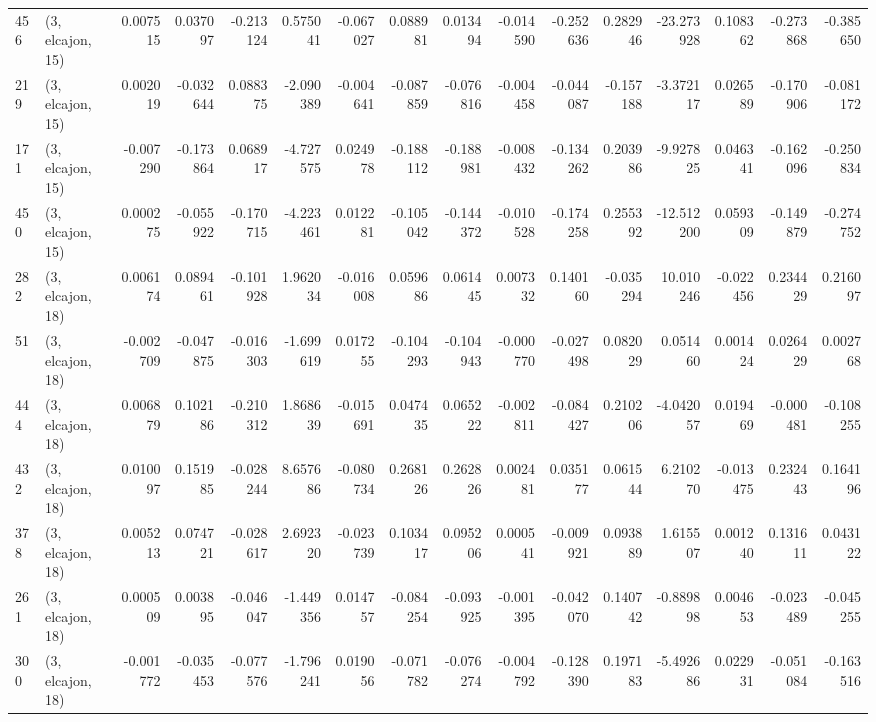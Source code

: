 \begin{tabular}{llrrrrrrrrrrrrrr}
456 &  (3, elcajon, 15) &   0.007515 &  0.037097 & -0.213124 &    0.575041 & -0.067027 &   0.088981 &  0.013494 & -0.014590 & -0.252636 &  0.282946 &   -23.273928 &  0.108362 & -0.273868 & -0.385650 \\
219 &  (3, elcajon, 15) &   0.002019 & -0.032644 &  0.088375 &   -2.090389 & -0.004641 &  -0.087859 & -0.076816 & -0.004458 & -0.044087 & -0.157188 &    -3.372117 &  0.026589 & -0.170906 & -0.081172 \\
171 &  (3, elcajon, 15) &  -0.007290 & -0.173864 &  0.068917 &   -4.727575 &  0.024978 &  -0.188112 & -0.188981 & -0.008432 & -0.134262 &  0.203986 &    -9.927825 &  0.046341 & -0.162096 & -0.250834 \\
450 &  (3, elcajon, 15) &   0.000275 & -0.055922 & -0.170715 &   -4.223461 &  0.012281 &  -0.105042 & -0.144372 & -0.010528 & -0.174258 &  0.255392 &   -12.512200 &  0.059309 & -0.149879 & -0.274752 \\
282 &  (3, elcajon, 18) &   0.006174 &  0.089461 & -0.101928 &    1.962034 & -0.016008 &   0.059686 &  0.061445 &  0.007332 &  0.140160 & -0.035294 &    10.010246 & -0.022456 &  0.234429 &  0.216097 \\
51  &  (3, elcajon, 18) &  -0.002709 & -0.047875 & -0.016303 &   -1.699619 &  0.017255 &  -0.104293 & -0.104943 & -0.000770 & -0.027498 &  0.082029 &     0.051460 &  0.001424 &  0.026429 &  0.002768 \\
444 &  (3, elcajon, 18) &   0.006879 &  0.102186 & -0.210312 &    1.868639 & -0.015691 &   0.047435 &  0.065222 & -0.002811 & -0.084427 &  0.210206 &    -4.042057 &  0.019469 & -0.000481 & -0.108255 \\
432 &  (3, elcajon, 18) &   0.010097 &  0.151985 & -0.028244 &    8.657686 & -0.080734 &   0.268126 &  0.262826 &  0.002481 &  0.035177 &  0.061544 &     6.210270 & -0.013475 &  0.232443 &  0.164196 \\
378 &  (3, elcajon, 18) &   0.005213 &  0.074721 & -0.028617 &    2.692320 & -0.023739 &   0.103417 &  0.095206 &  0.000541 & -0.009921 &  0.093889 &     1.615507 &  0.001240 &  0.131611 &  0.043122 \\
261 &  (3, elcajon, 18) &   0.000509 &  0.003895 & -0.046047 &   -1.449356 &  0.014757 &  -0.084254 & -0.093925 & -0.001395 & -0.042070 &  0.140742 &    -0.889898 &  0.004653 & -0.023489 & -0.045255 \\
300 &  (3, elcajon, 18) &  -0.001772 & -0.035453 & -0.077576 &   -1.796241 &  0.019056 &  -0.071782 & -0.076274 & -0.004792 & -0.128390 &  0.197183 &    -5.492686 &  0.022931 & -0.051084 & -0.163516 \\

\end{tabular}
